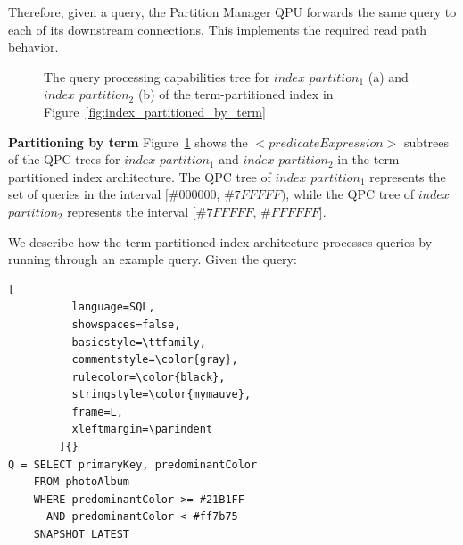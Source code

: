 Therefore,
given a query,
the Partition Manager QPU forwards the same query to each of its downstream connections.
This implements the required read path behavior.

\begin{figure}

\caption{The query processing capabilities tree for $index$ $partition_1$ (a) and $index$ $partition_2$ (b) of the term-partitioned
index in Figure~\ref{fig:index_partitioned_by_term}}
\label{fig:qpt_index_partitioning_terms}
\end{figure}

\medskip
\noindent
\textbf{Partitioning by term}
Figure~\ref{fig:qpt_index_partitioning_terms} shows the $<predicateExpression>$ subtrees of the QPC trees
for $index$ $partition_1$ and $index$ $partition_2$ in the term-partitioned index architecture.
The QPC tree of $index$ $partition_1$ represents the set of queries in the interval $[\#000000$, $\#7FFFFF)$,
while the QPC tree of $index$ $partition_2$ represents the interval $[\#7FFFFF$, $\#FFFFFF]$.

We describe how the term-partitioned index architecture processes queries by running through an example query.
Given the query:

\begin{lstlisting}[
          language=SQL,
          showspaces=false,
          basicstyle=\ttfamily,
          commentstyle=\color{gray},
          rulecolor=\color{black},
          stringstyle=\color{mymauve},
          frame=L,
          xleftmargin=\parindent
        ]{}
Q = SELECT primaryKey, predominantColor
    FROM photoAlbum
    WHERE predominantColor >= #21B1FF
      AND predominantColor < #ff7b75
    SNAPSHOT LATEST
\end{lstlisting}

